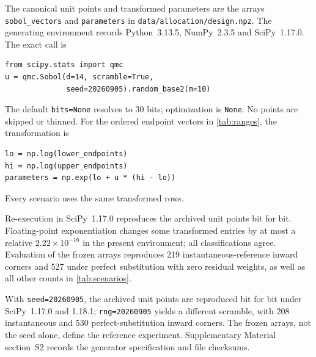 The canonical unit points and transformed parameters are the arrays
\texttt{sobol\_vectors} and \texttt{parameters} in
\texttt{data/allocation/design.npz}. The generating environment records
Python~3.13.5, NumPy~2.3.5 and SciPy~1.17.0. The exact call is
\begin{verbatim}
from scipy.stats import qmc
u = qmc.Sobol(d=14, scramble=True,
              seed=20260905).random_base2(m=10)
\end{verbatim}
The default \texttt{bits=None} resolves to 30 bits; optimization is
\texttt{None}. No points are skipped or thinned. For the ordered endpoint
vectors in \cref{tab:ranges}, the transformation is
\begin{verbatim}
lo = np.log(lower_endpoints)
hi = np.log(upper_endpoints)
parameters = np.exp(lo + u * (hi - lo))
\end{verbatim}
Every scenario uses the same transformed rows.

Re-execution in SciPy~1.17.0 reproduces the archived unit points bit for
bit. Floating-point exponentiation changes some transformed entries by
at most a relative $2.22\times10^{-16}$ in the present environment;
all classifications agree. Evaluation of the frozen arrays reproduces
219 instantaneous-reference inward corners and 527 under perfect
substitution with zero residual weights, as well as all other counts
in \cref{tab:scenarios}.

With \texttt{seed=20260905}, the archived unit points are reproduced
bit for bit under SciPy~1.17.0 and 1.18.1;
\texttt{rng=20260905} yields a different scramble, with 208
instantaneous and 530 perfect-substitution inward corners.
The frozen arrays, not the seed alone, define the reference experiment.
Supplementary Material section~S2 records the generator specification
and file checksums.


